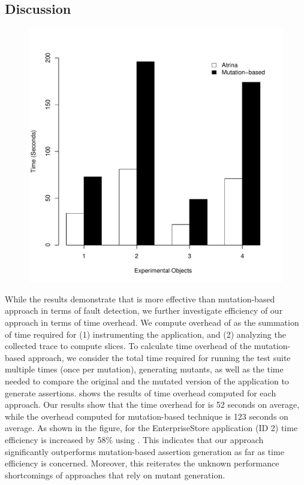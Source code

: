 \subsection{Discussion} \label{Sec:discussion}
\begin{figure}[!t]
  \centering
  \includegraphics[width=1\hsize]{r-scripts/performance}
  \vspace{-0.18in}   
  \vspace{-0.1in} 
  \label{Fig:performance}
\end{figure}
 While the results demonstrate that \tool is more effective than mutation-based approach in terms of fault detection, we further investigate efficiency of our approach in terms of time overhead. 
We compute overhead of \tool as the summation of time required for (1) instrumenting the application, and (2) analyzing the collected trace to compute \javascript slices. To calculate time overhead of the mutation-based approach, we consider the total time required for running the test suite multiple times (once per mutation), generating mutants, as well as the time needed to compare the original and the mutated version of the application to generate assertions.  shows the results of time overhead computed for each approach.    
Our results show that the time overhead for \tool is 52 seconds on average, while the overhead computed for mutation-based technique is 123 seconds on average. As shown in the figure, for the EnterpriseStore application (ID 2) time efficiency is increased by 58\% using \tool. This indicates that our approach significantly outperforms mutation-based assertion generation as far as time efficiency is concerned. Moreover, this reiterates the unknown performance shortcomings of approaches that rely on mutant generation.
